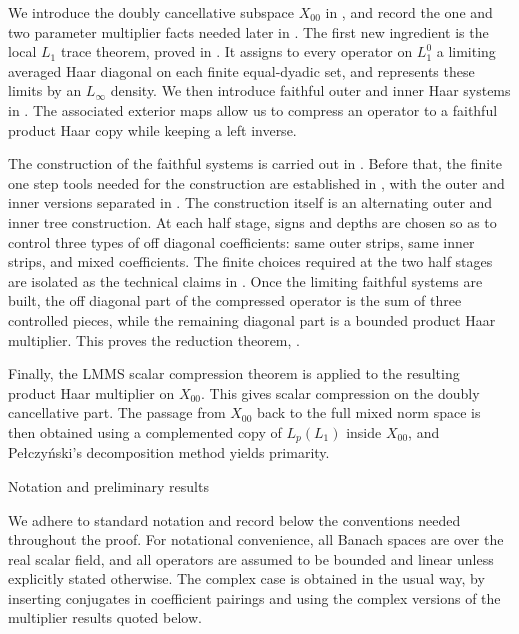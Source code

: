 \documentclass[11pt,reqno]{amsart}
\makeatletter
\theoremstyle{plain}
\theoremstyle{definition}
\newcounter{problempaper}
\newenvironment{problempaperbody}{%
  \setcounter{subsection}{0}%
  \setcounter{subsubsection}{0}%
  \setcounter{paragraph}{0}%
  \renewcommand{\thesubsection}{\arabic{subsection}}%
  \renewcommand{\thesubsubsection}{\thesubsection.\arabic{subsubsection}}%
  \renewcommand{\theparagraph}{\thesubsubsection.\arabic{paragraph}}%
  \let\problem@outersection\section
  \let\problem@outersubsection\subsection
  \let\problem@outersubsubsection\subsubsection
  \let\problem@outerparagraph\paragraph
  \let\section\problem@papersection
  \let\subsection\problem@papersubsection
  \let\subsubsection\problem@papersubsubsection
}{%
  \let\section\problem@outersection
  \let\subsection\problem@outersubsection
  \let\subsubsection\problem@outersubsubsection
  \let\paragraph\problem@outerparagraph
}
\newcommand{\problem@target}[2]{%
  \hypertarget{problem-\theproblempaper-#1-#2}{}%
}
\newcommand{\problem@paperheading}[3]{%
  \par\bigskip
  \problem@target{#1}{#2}%
  \noindent{\large\bfseries #2.\quad #3\par}%
  \nobreak\smallskip
}
\newcommand{\problem@papersubheading}[3]{%
  \par\medskip
  \problem@target{#1}{#2}%
  \noindent{\normalsize\bfseries #2.\quad #3\par}%
  \nobreak\smallskip
}
\newcommand{\problem@papersubsubheading}[3]{%
  \par\smallskip
  \problem@target{#1}{#2}%
  \noindent{\normalsize\itshape #2.\quad #3.\ }%
}
\def\problem@papersection{%
  \@ifstar{\problem@papersectionstar}{\problem@papersectionnostar}%
}
\def\problem@papersectionstar#1{%
  \par\bigskip\noindent{\large\bfseries #1\par}\nobreak\smallskip
}
\def\problem@papersectionnostar#1{%
  \refstepcounter{subsection}%
  \setcounter{subsubsection}{0}%
  \setcounter{paragraph}{0}%
  \problem@paperheading{section}{\thesubsection}{#1}%
  \problem@writecontentsline{section}{\thesubsection}{#1}%
}
\def\problem@papersubsection{%
  \@ifstar{\problem@papersubsectionstar}{\problem@papersubsectionnostar}%
}
\def\problem@papersubsectionstar#1{%
  \par\medskip\noindent{\normalsize\bfseries #1\par}\nobreak\smallskip
}
\def\problem@papersubsectionnostar#1{%
  \refstepcounter{subsubsection}%
  \setcounter{paragraph}{0}%
  \problem@papersubheading{subsection}{\thesubsubsection}{#1}%
  \problem@writecontentsline{subsection}{\thesubsubsection}{#1}%
}
\def\problem@papersubsubsection{%
  \@ifstar{\problem@papersubsubsectionstar}{\problem@papersubsubsectionnostar}%
}
\def\problem@papersubsubsectionstar#1{%
  \par\smallskip\noindent{\normalsize\itshape #1.\ }%
}
\def\problem@papersubsubsectionnostar#1{%
  \refstepcounter{paragraph}%
  \problem@papersubsubheading{subsubsection}{\theparagraph}{#1}%
  \problem@writecontentsline{subsubsection}{\theparagraph}{#1}%
}
\newcommand{\problem@writecontentsline}[3]{%
  \begingroup
  \protected@write\@auxout{}{%
    \string\problemcontentsentry{\theproblempaper}{#1}{#2}{#3}{\thepage}%
  }%
  \endgroup
}
\newcommand{\problemcontentsentry}[5]{%
  \@ifundefined{problemcontents@#1}{%
    \expandafter\gdef\csname problemcontents@#1\endcsname{}%
  }{}%
  \expandafter\g@addto@macro\csname problemcontents@#1\endcsname{%
    \problemcontentsline{#1}{#2}{#3}{#4}{#5}%
  }%
}
\newcommand{\problemcontentslink}[4]{%
  \hyperlink{problem-#1-#2-#3}{#4}%
}
\newcommand{\problemcontentsline}[5]{%
  \ifstrequal{#2}{section}{%
    \par\noindent
    \problemcontentslink{#1}{#2}{#3}{\makebox[2.5em][l]{#3}#4}%
    \nobreak\dotfill
    \problemcontentslink{#1}{#2}{#3}{#5}\par
  }{%
    \ifstrequal{#2}{subsection}{%
      \par\noindent\hspace*{1.5em}%
      \problemcontentslink{#1}{#2}{#3}{\makebox[3.5em][l]{#3}#4}%
      \nobreak\dotfill
      \problemcontentslink{#1}{#2}{#3}{#5}\par
    }{%
      \par\noindent\hspace*{3em}%
      \problemcontentslink{#1}{#2}{#3}{\makebox[4.5em][l]{#3}#4}%
      \nobreak\dotfill
      \problemcontentslink{#1}{#2}{#3}{#5}\par
    }%
  }%
}
\makeatother
\begin{document}
\begin{problempaperbody}
We introduce the doubly cancellative subspace $X_{00}$ in , and record the one and two parameter multiplier facts needed later in . The first new ingredient is the local $L_1$ trace theorem, proved in . It assigns to every operator on $L_1^0$ a limiting averaged Haar diagonal on each finite equal-dyadic set, and represents these limits by an $L_\infty$ density. We then introduce faithful outer and inner Haar systems in . The associated exterior maps allow us to compress an operator to a faithful product Haar copy while keeping a left inverse.

The construction of the faithful systems is carried out in . Before that, the finite one step tools needed for the construction are established in , with the outer and inner versions separated in . The construction itself is an alternating outer and inner tree construction. At each half stage, signs and depths are chosen so as to control three types of off diagonal coefficients: same outer strips, same inner strips, and mixed coefficients. The finite choices required at the two half stages are isolated as the technical claims in . Once the limiting faithful systems are built, the off diagonal part of the compressed operator is the sum of three controlled pieces, while the remaining diagonal part is a bounded product Haar multiplier. This proves the reduction theorem, .

Finally, the LMMS scalar compression theorem is applied to the resulting product Haar multiplier on $X_{00}$. This gives scalar compression on the doubly cancellative part. The passage from $X_{00}$ back to the full mixed norm space is then obtained using a complemented copy of $L_p(L_1)$ inside $X_{00}$, and Pe{\l}czy\'nski's decomposition method yields primarity.


\section{Notation and preliminary results}
\label{p3:sec:preliminary-results}

We adhere to standard notation and record below the conventions needed throughout the proof. For notational convenience, all Banach spaces are over the real scalar field, and all operators are assumed to be bounded and linear unless explicitly stated otherwise. The complex case is obtained in the usual way, by inserting conjugates in coefficient pairings and using the complex versions of the multiplier results quoted below.


\end{problempaperbody}
\end{document}
